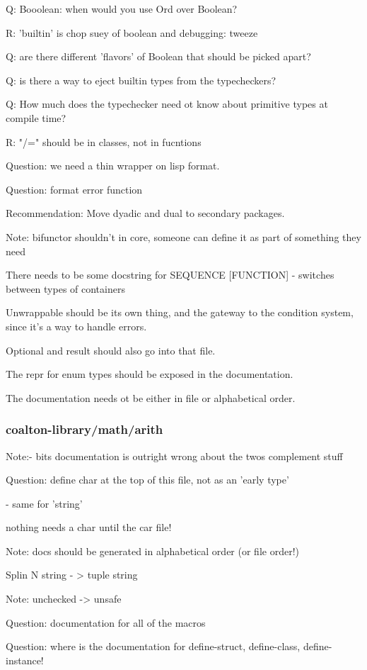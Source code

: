 \documentclass[12pt]{article}
\begin{document}
Q: Booolean: when would you use Ord over Boolean?

R: 'builtin' is chop suey of boolean and debugging: tweeze

Q: are there different 'flavors' of Boolean that should be picked apart?

Q: is there a way to eject builtin types from the typecheckers?

Q:  How much does the typechecker need ot know about primitive types at compile time?

R: "/=" should be in classes, not in fucntions

Question: we need a thin wrapper on lisp format.

Question: format error function

Recommendation: Move dyadic and dual to secondary packages.

Note: bifunctor shouldn't in core, someone can define it as part of
      something they need

There needs to be some docstring for SEQUENCE [FUNCTION] - switches between types of containers

Unwrappable should be its own thing, and the gateway to the condition
system, since it's a way to handle errors.

Optional and result should also go into that file.

The repr for enum types should be exposed in the documentation.

The documentation needs ot be either in file or alphabetical order.

\subsubsection{coalton-library/math/arith}

Note:- bits documentation is outright wrong about the twos complement stuff

Question: define char at the top of this file, not as an 'early type'

    - same for 'string'

nothing needs a char until the car file!

Note: docs should be generated in alphabetical order (or file order!)

Splin N string - > tuple string

Note: unchecked -> unsafe

Question: documentation for all of the macros

Question: where is the documentation for define-struct, define-class, define-instance!
\end{document}
